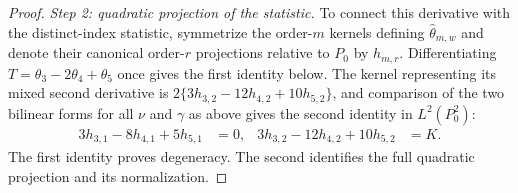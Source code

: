 \begin{proof}
\medskip\noindent
\emph{Step 2: quadratic projection of the statistic.}
To connect this derivative with the distinct-index statistic, symmetrize the
order-$m$ kernels defining $\widehat\theta_{m,w}$ and denote their canonical
order-$r$ projections relative to $P_0$ by $h_{m,r}$. Differentiating
$T=\theta_3-2\theta_4+\theta_5$ once gives the first identity below. The
kernel representing its mixed second derivative is
$2\{3h_{3,2}-12h_{4,2}+10h_{5,2}\}$, and comparison of the two bilinear forms
for all $\nu$ and $\gamma$ as above gives the second identity in
$L^2(P_0^2)$:
\begin{align*}
  3h_{3,1}-8h_{4,1}+5h_{5,1}
  &=0,
  &
  3h_{3,2}-12h_{4,2}+10h_{5,2}
  &=K.
\end{align*}
The first identity proves degeneracy. The second identifies the full
quadratic projection and its normalization.


\end{proof}
